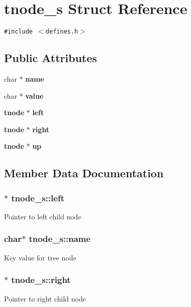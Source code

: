\section{tnode\_\-s Struct Reference}
\label{structtnode__s}
{\tt \#include $<$defines.h$>$}

\subsection*{Public Attributes}
\begin{CompactItemize}
\item 
char $\ast$ {\bf name}
\item 
char $\ast$ {\bf value}
\item 
{\bf tnode} $\ast$ {\bf left}
\item 
{\bf tnode} $\ast$ {\bf right}
\item 
{\bf tnode} $\ast$ {\bf up}
\end{CompactItemize}


\subsection{Member Data Documentation}
\subsubsection{$\ast$ {\bf tnode\_\-s::left}}\label{structtnode__s_o2}


Pointer to left child node 
\subsubsection{\setlength{\rightskip}{0pt plus 5cm}char$\ast$ {\bf tnode\_\-s::name}}\label{structtnode__s_o0}


Key value for tree node 
\subsubsection{$\ast$ {\bf tnode\_\-s::right}}\label{structtnode__s_o3}


Pointer to right child node 
